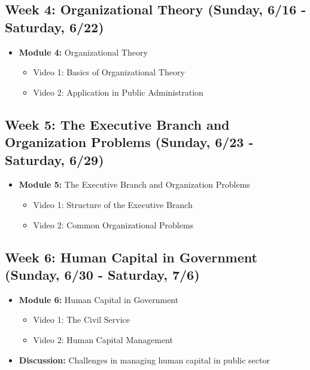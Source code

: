 \documentclass[11pt, letterpaper]{article}
\begin{document}
\subsection*{Week 4: Organizational Theory (Sunday, 6/16 - Saturday, 6/22)}
\begin{itemize}
    \item \textbf{Module 4:} Organizational Theory
    \begin{itemize}
        \item Video 1: Basics of Organizational Theory
        \item Video 2: Application in Public Administration
    \end{itemize}
\end{itemize}

\subsection*{Week 5: The Executive Branch and Organization Problems (Sunday, 6/23 - Saturday, 6/29)}
\begin{itemize}
    \item \textbf{Module 5:} The Executive Branch and Organization Problems
    \begin{itemize}
        \item Video 1: Structure of the Executive Branch
        \item Video 2: Common Organizational Problems
    \end{itemize}
\end{itemize}

\subsection*{Week 6: Human Capital in Government (Sunday, 6/30 - Saturday, 7/6)}
\begin{itemize}
    \item \textbf{Module 6:} Human Capital in Government
    \begin{itemize}
        \item Video 1: The Civil Service
        \item Video 2: Human Capital Management
    \end{itemize}
    \item \textbf{Discussion:} Challenges in managing human capital in public sector
\end{itemize}
\end{document}
